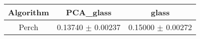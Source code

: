 \begin{table}
\begin{center}
\begin{tabular}{|c|c|c|}
\hline
\bf Algorithm & \bf PCA\_glass & \bf glass\\
\hline
Perch & 0.13740 $\pm$ 0.00237 & 0.15000 $\pm$ 0.00272 \\
\hline
\end{tabular}
\end{center}
\end{table}
